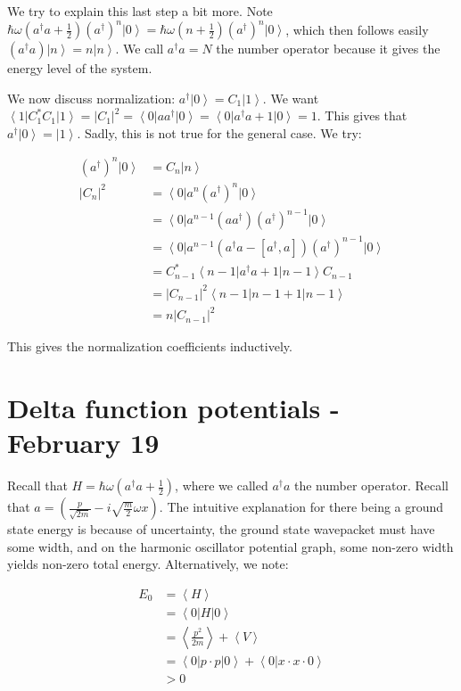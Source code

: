 \documentclass{report}
\newcommand{\ket}[1]{\left| #1 \right>} %
\newcommand{\bra}[1]{\left< #1 \right|} %
\begin{document}
We try to explain this last step a bit more. Note $\hbar\omega\left(a^\dagger a + \frac{1}{2}\right)(a^\dagger)^n\ket{0} = \hbar\omega\left(n+\frac{1}{2}\right)(a^\dagger)^n\ket{0}$, which then follows easily $(a^\dagger a)\ket{n} = n\ket{n}$. We call $a^\dagger a = N$ the number operator because it gives the energy level of the system.

We now discuss normalization: $a^\dagger\ket{0} = C_1\ket{1}$. We want $\bra{1}C_1^*C_1\ket{1} = |C_1|^2 = \bra{0}aa^\dagger\ket{0} = \bra{0}a^\dagger a+1\ket{0} = 1$. This gives that $a^\dagger \ket{0} = \ket{1}$. Sadly, this is not true for the general case. We try:

\begin{align*}
(a^\dagger)^n\ket{0} &= C_n\ket{n}\\
|C_n|^2 &= \bra{0}a^n(a^\dagger)^n\ket{0}\\
&= \bra{0}a^{n-1}(aa^\dagger)(a^\dagger)^{n-1} \ket{0}\\
&= \bra{0}a^{n-1}(a^\dagger a-[a^\dagger,a])(a^\dagger)^{n-1}\ket{0}\\
&= C_{n-1}^* \bra{n-1}a^\dagger a +1\ket{n-1}C_{n-1}\\
&= |C_{n-1}|^2\bra{n-1}n-1+1\ket{n-1}\\
&= n|C_{n-1}|^2
\end{align*}

This gives the normalization coefficients inductively. 

\chapter{Delta function potentials - February 19}

Recall that $H = \hbar\omega\left(a^\dagger a + \frac{1}{2}\right)$, where we called $a^\dagger a$ the number operator. Recall that $a = \left(\frac{p}{\sqrt{2m}} - i\sqrt{\frac{m}{2}}\omega x\right)$. The intuitive explanation for there being a ground state energy is because of uncertainty, the ground state wavepacket must have some width, and on the harmonic oscillator potential graph, some non-zero width yields non-zero total energy. Alternatively, we note:

\begin{align*}
E_0 &= \left<H\right>\\
&= \left<0|H|0\right>\\
&= \left<\frac{p^2}{2m}\right> + \left<V\right>\\
&= \left<0|p \cdot p|0\right> + \left<0|x\cdot x\cdot 0\right>\\
&> 0
\end{align*}
\end{document}
